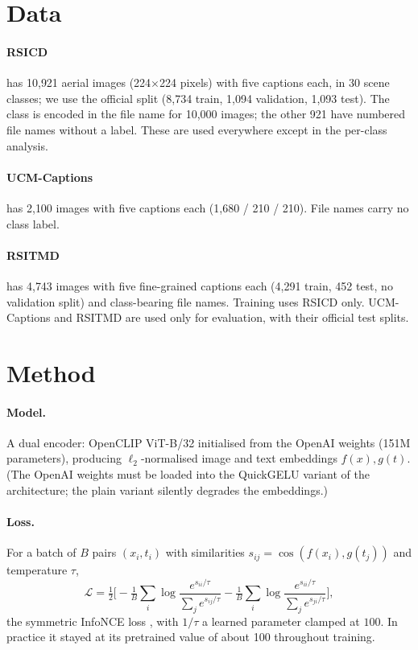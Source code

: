 \documentclass[11pt,a4paper]{article}
\begin{document}
\section{Data}
\paragraph{RSICD} \citep{lu2018rsicd} has 10{,}921 aerial images (224$\times$224 pixels) with five captions each, in 30 scene classes; we use the official split (8{,}734 train, 1{,}094 validation, 1{,}093 test). The class is encoded in the file name for 10{,}000 images; the other 921 have numbered file names without a label. These are used everywhere except in the per-class analysis.
\paragraph{UCM-Captions} \citep{qu2016ucm} has 2{,}100 images with five captions each (1{,}680 / 210 / 210). File names carry no class label.
\paragraph{RSITMD} \citep{yuan2022rsitmd} has 4{,}743 images with five fine-grained captions each (4{,}291 train, 452 test, no validation split) and class-bearing file names.
Training uses RSICD only. UCM-Captions and RSITMD are used only for evaluation, with their official test splits.

\section{Method}
\paragraph{Model.} A dual encoder: OpenCLIP \citep{ilharco2021openclip} ViT-B/32 initialised from the OpenAI weights \citep{radford2021clip} (151M parameters), producing $\ell_2$-normalised image and text embeddings $f(x),g(t)$. (The OpenAI weights must be loaded into the QuickGELU variant of the architecture; the plain variant silently degrades the embeddings.)
\paragraph{Loss.} For a batch of $B$ pairs $(x_i,t_i)$ with similarities $s_{ij}=\cos(f(x_i),g(t_j))$ and temperature $\tau$,
\begin{equation}
\mathcal L=\tfrac12\Big[-\tfrac1B\sum_i\log\frac{e^{s_{ii}/\tau}}{\sum_j e^{s_{ij}/\tau}}-\tfrac1B\sum_i\log\frac{e^{s_{ii}/\tau}}{\sum_j e^{s_{ji}/\tau}}\Big],
\end{equation}
the symmetric InfoNCE loss \citep{oord2018cpc,radford2021clip}, with $1/\tau$ a learned parameter clamped at $100$. In practice it stayed at its pretrained value of about 100 throughout training.
\end{document}
